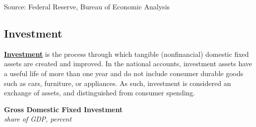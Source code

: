 \documentclass{report}
\makeatletter
\newcommand*\short[1]{\expandafter\@gobbletwo\number\numexpr#1\relax}
\newcommand{\sbar}[4]{
		\addplot[ybar stacked, bar width=2.3pt, draw opacity=0, fill=#1] 
			table [x=#2, y=#3, col sep=comma]{#4};}
\newcommand{\absnode}[3]{\node[below right, align=left] at (axis cs: #1,#2) {#3};}
\newcommand{\dateaxisticks}{
		date coordinates in=x, axis line style={draw=none},
		xmax={2024-01-31},
		max space between ticks=40,	    
		xtick={{1990-01-01}, {1992-01-01}, {1994-01-01}, 
			{1996-01-01}, {1998-01-01}, {2000-01-01}, 
			{2002-01-01}, {2004-01-01}, {2006-01-01},
			{2008-01-01}, {2010-01-01}, {2012-01-01}, {2014-01-01},
		    {2016-01-01}, {2018-01-01}, {2020-01-01}, {2022-01-01}, 
		    {2024-01-01}, {2026-01-01}},
		minor xtick={{1989-01-01}, {1991-01-01}, {1993-01-01},
			{1995-01-01}, {1997-01-01}, {1999-01-01}, 
			{2001-01-01}, {2003-01-01}, {2005-01-01}, {2007-01-01},
		    {2009-01-01}, {2011-01-01}, {2013-01-01}, {2015-01-01},
		    {2017-01-01}, {2019-01-01}, {2021-01-01}, {2023-01-01}, 
		    {2025-01-01}, {2027-01-01}},
		enlarge y limits={0.06}, enlarge x limits={0.01},
		xticklabel style={align=center, yshift=-2pt}, tick label style={inner sep=0pt},
		}
\newcommand{\bbar}[2]{extra #1 ticks = {{#2}}, extra #1 tick labels = ,
		extra #1 tick style = {grid=major, grid style={thick, black!25}},}
\newcommand{\stdline}[4]{\addplot[very thick, no markers, color=#1] 
		table [x=#2, y=#3, col sep=comma] {#4};	}
\newcommand{\rbars}{
		\fill[color=black!10] (axis cs:{1990-07-01},\pgfkeysvalueof{/pgfplots/ymin})
			rectangle (axis cs:{1991-03-01}, \pgfkeysvalueof{/pgfplots/ymax});
		\fill[color=black!10] (axis cs:{2007-12-01},\pgfkeysvalueof{/pgfplots/ymin})
			rectangle (axis cs:{2009-07-01}, \pgfkeysvalueof{/pgfplots/ymax});
		\fill[color=black!10] (axis cs:{2001-03-01},\pgfkeysvalueof{/pgfplots/ymin})
			rectangle (axis cs:{2001-11-01}, \pgfkeysvalueof{/pgfplots/ymax});
		\fill[color=black!10] (axis cs:{2020-02-01},\pgfkeysvalueof{/pgfplots/ymin})
			rectangle (axis cs:{2020-05-01}, \pgfkeysvalueof{/pgfplots/ymax});}
\makeatother
\begin{document}
{\begin{minipage}{1.0\textwidth}
 \setlength{\tabcolsep}{4.2pt} \color{black!90}
		{\renewcommand{\arraystretch}{1.6}
		 \begin{tabular}{p{39mm} R{8mm} R{8mm} R{8mm} R{8mm} 
		   R{8mm} R{8mm} R{8mm} }
			  \hline
		\end{tabular}}	\vspace{-2mm}
		
\footnotesize{Source: Federal Reserve, Bureau of Economic Analysis}
\end{minipage}
\newpage
\vspace*{-9mm}

\hypertarget{ofi}{\label{ofi}}
\begin{minipage}{1.0\textwidth}
\subsection*{Investment}    

\small \textbf{\href{https://www.bea.gov/resources/learning-center/what-to-know-fixed-assets}{Investment}} is the process through which tangible (nonfinancial) domestic fixed assets are created and improved. In the national accounts, investment assets have a useful life of more than one year and do not include consumer durable goods such as cars, furniture, or appliances. As such, investment is considered an exchange of assets, and distinguished from consumer spending. 

 


\vspace{1mm}

\normalsize \textbf{Gross Domestic Fixed Investment}\\
\footnotesize{\textit{share of GDP, percent}}
\vspace{2.85cm}

\hspace{3mm} 


\end{minipage}}
\end{document}
